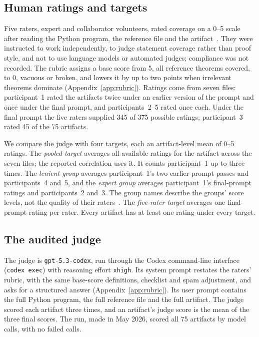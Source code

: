 \subsection{Human ratings and targets}
\label{sec:targets}
Five raters, expert and collaborator volunteers, rated coverage on a 0--5 scale after reading the Python program, the reference file and the artifact~\citep{veribench2026}.
They were instructed to work independently, to judge statement coverage rather than proof style, and not to use language models or automated judges; compliance was not recorded.
The rubric assigns a base score from 5, all reference theorems covered, to 0, vacuous or broken, and lowers it by up to two points when irrelevant theorems dominate (Appendix~\ref{app:rubric}).
Ratings come from seven files: participant~1 rated the artifacts twice under an earlier version of the prompt and once under the final prompt, and participants~2--5 rated once each.
Under the final prompt the five raters supplied 345 of 375 possible ratings; participant~3 rated 45 of the 75 artifacts.

We compare the judge with four targets, each an artifact-level mean of 0--5 ratings.
The \emph{pooled target} averages all available ratings for the artifact across the seven files; the reported correlation uses it.
It counts participant~1 up to three times.
The \emph{lenient group} averages participant~1's two earlier-prompt passes and participants~4 and~5, and the \emph{expert group} averages participant~1's final-prompt ratings and participants~2 and~3.
The group names describe the groups' score levels, not the quality of their raters~\citep{veribench2026}.
The \emph{five-rater target} averages one final-prompt rating per rater.
Every artifact has at least one rating under every target.

\subsection{The audited judge}
\label{sec:judge}
The judge is \texttt{gpt-5.3-codex}, run through the Codex command-line interface (\texttt{codex exec}) with reasoning effort \texttt{xhigh}.
Its system prompt restates the raters' rubric, with the same base-score definitions, checklist and spam adjustment, and asks for a structured answer (Appendix~\ref{app:rubric}).
Its user prompt contains the full Python program, the full reference file and the full artifact.
The judge scored each artifact three times, and an artifact's judge score is the mean of the three final scores.
The run, made in May 2026, scored all 75 artifacts by model calls, with no failed calls.

